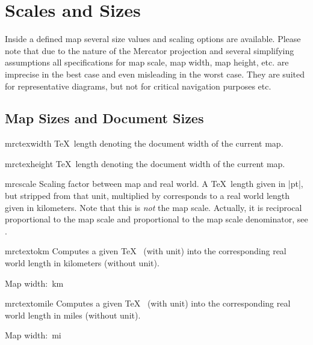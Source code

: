 \clearpage
\section{Scales and Sizes}%

Inside a defined map several size values and scaling options are
available. Please note that due to the nature of the Mercator projection and several
simplifying assumptions all specifications for map scale, map width, map height,
etc. are imprecise in the best case and even misleading in the worst case.
They are suited for representative diagrams,
but not for critical navigation purposes etc.

\subsection{Map Sizes and Document Sizes}

\begin{docCommand}{mrctexwidth}{}
  \TeX\ length denoting the document width of the current map.
\end{docCommand}

\begin{docCommand}{mrctexheight}{}
  \TeX\ length denoting the document width of the current map.
\end{docCommand}

\begin{docCommand}{mrcscale}{}
  Scaling factor between map and real world.
  A \TeX\ length given in |pt|, but stripped from that unit,
  multiplied by  corresponds to a real world length
  given in kilometers.
  Note that this is \emph{not} the map scale.
  Actually, it is reciprocal proportional to the map scale
  and proportional to the map scale denominator, see .
\end{docCommand}

\begin{docCommand}{mrctextokm}{}
  Computes a given \TeX\  (with unit) into the corresponding
  real world length in kilometers (without unit).
  \begin{dispListing}
  Map width: \mrctextokm{\mrctexwidth}\,km
  \end{dispListing}
\end{docCommand}

\begin{docCommand}{mrctextomile}{}
  Computes a given \TeX\  (with unit) into the corresponding
  real world length in miles (without unit).
  \begin{dispListing}
  Map width: \mrctextomile{\mrctexwidth}\,mi
  \end{dispListing}
\end{docCommand}


